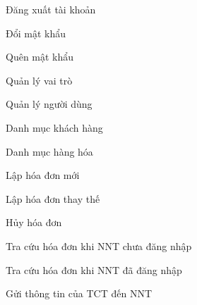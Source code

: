 Đăng xuất tài khoản

Đổi mật khẩu

Quên mật khẩu


Quản lý vai trò

Quản lý người dùng


Danh mục khách hàng

Danh mục hàng hóa


Lập hóa đơn mới

Lập hóa đơn thay thế

Hủy hóa đơn


Tra cứu hóa đơn khi NNT chưa đăng nhập

Tra cứu hóa đơn khi NNT đã đăng nhập


Gửi thông tin của TCT đến NNT